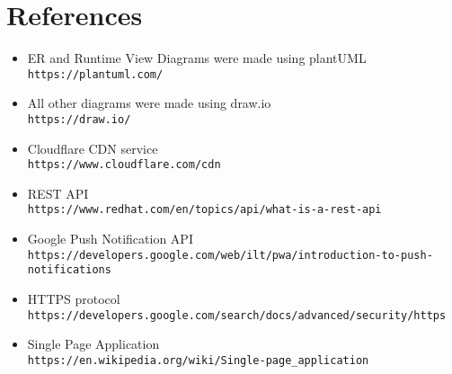 
\section{References}
\begin{itemize}
    \item ER and Runtime View Diagrams were made using plantUML\\\texttt{https://plantuml.com/}
    \item All other diagrams were made using draw.io\\\texttt{https://draw.io/}
    \item Cloudflare CDN service\\\texttt{https://www.cloudflare.com/cdn}
    \item REST API\\\texttt{https://www.redhat.com/en/topics/api/what-is-a-rest-api}
    \item Google Push Notification API\\\texttt{https://developers.google.com/web/ilt/pwa/introduction-to-push-notifications}
    \item HTTPS protocol\\\texttt{https://developers.google.com/search/docs/advanced/security/https}
    \item Single Page Application\\\texttt{https://en.wikipedia.org/wiki/Single-page\_application}
\end{itemize}
